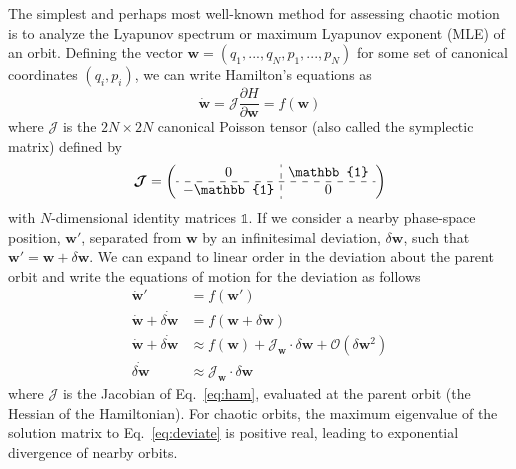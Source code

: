 \documentclass[letterpaper,12pt,preprint]{aastex}
\newcommand{\bs}[1]{\boldsymbol{#1}}
\newcommand{\ident}{\mathbb{1}}
\newcommand{\jac}{\mathscr{J}}
\begin{document}
The simplest and perhaps most well-known method for assessing chaotic motion is to analyze the Lyapunov spectrum or maximum Lyapunov exponent (MLE) of an orbit. Defining the vector $\bs{w} = (q_1,...,q_N,p_1,...,p_N)$ for some set of canonical coordinates $(q_i,p_i)$, we can write Hamilton's equations as 
\begin{equation}
	\dot{\bs{w}} = \bs{\mathcal{J}} \frac{\partial H}{\partial \bs{w}} = f(\bs{w}) \label{eq:ham}
\end{equation}
where $\bs{\mathcal{J}}$ is the $2N \times 2N$ canonical Poisson tensor (also called the symplectic matrix) defined by
\begin{equation}
	\bs{\mathcal{J}} = \left( \begin{array}{c:c} 0 & \ident \\ \hdashline -\ident & 0 \end{array} \right)
\end{equation}
with $N$-dimensional identity matrices $\ident$. If we consider a nearby phase-space position, $\bs{w}'$, separated from $\bs{w}$ by an infinitesimal deviation, $\delta \bs{w}$, such that $\bs{w}' = \bs{w} + \delta \bs{w}$. We can expand to linear order in the deviation about the parent orbit and write the equations of motion for the deviation as follows
\begin{align}
	\dot{\bs{w}}' &= f(\bs{w}')\\
	\dot{\bs{w}} + \dot{\delta \bs{w}} &= f(\bs{w} +  \delta \bs{w})\\
	\dot{\bs{w}} + \dot{\delta \bs{w}} &\approx f(\bs{w}) + \jac_{\bs{w}}\cdot\delta \bs{w} + \mathcal{O}(\delta \bs{w}^2)\\
	\dot{\delta \bs{w}} &\approx \jac_{\bs{w}} \cdot  \delta \bs{w}\label{eq:deviate}
\end{align}
where $\jac$ is the Jacobian of Eq.~\ref{eq:ham}, evaluated at the parent orbit (the Hessian of the Hamiltonian). For chaotic orbits, the maximum eigenvalue of the solution matrix to Eq.~\ref{eq:deviate} is positive real, leading to exponential divergence of nearby orbits. 
\end{document}
